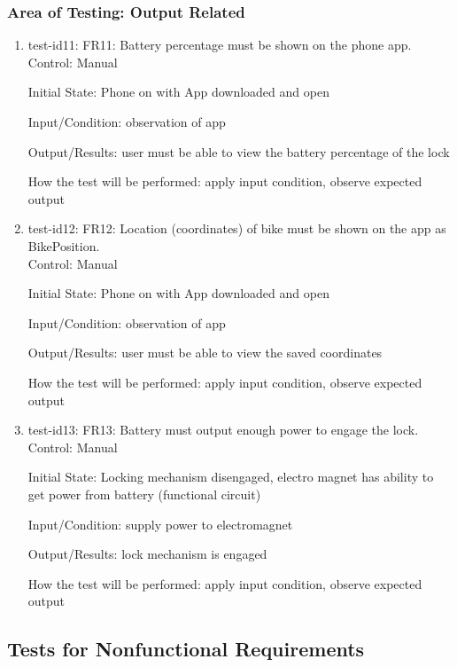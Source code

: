 \documentclass[12pt, titlepage]{article}
\begin{document}
\subsubsection{Area of Testing: Output Related}

\begin{enumerate}

\item{test-id11: FR11: Battery percentage must be shown on the phone app. \\}
Control: Manual 

Initial State: Phone on with App downloaded and open 

Input/Condition: observation of app 

Output/Results: user must be able to view the battery percentage of the lock 

How the test will be performed: apply input condition, observe expected output

\item{test-id12: FR12: Location (coordinates) of bike must be shown on the app as BikePosition. \\}
Control: Manual 

Initial State: Phone on with App downloaded and open 

Input/Condition: observation of app 

Output/Results: user must be able to view the saved coordinates 

How the test will be performed: apply input condition, observe expected output

\item{test-id13: FR13: Battery must output enough power to engage the lock. \\}
Control: Manual 

Initial State: Locking mechanism disengaged, electro magnet has ability to get power from battery (functional circuit) 

Input/Condition: supply power to electromagnet 

Output/Results: lock mechanism is engaged 

How the test will be performed: apply input condition, observe expected output

\end{enumerate}

\subsection{Tests for Nonfunctional Requirements}
\label{Section 5.2}
\end{document}
